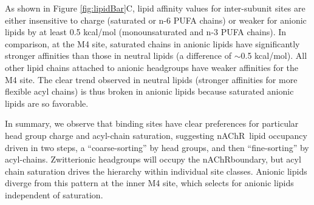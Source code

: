 \documentclass[%
 aip,
 amsmath,amssymb,
 preprint,%
]{revtex4-1}\usepackage{setspace}
\newcommand{\nachr}{nAChR}
\begin{document}
As shown in Figure \ref{fig:lipidBar}C, lipid affinity values for inter-subunit sites are either insensitive to charge (saturated or n-6 PUFA chains) or weaker for anionic lipids by at least 0.5 kcal/mol (monounsaturated and n-3 PUFA chains).  In comparison, at the M4 site, saturated chains in anionic lipids have significantly stronger affinities than those in neutral lipids (a difference of $\sim$0.5 kcal/mol). All other lipid chains attached to anionic headgroups have weaker affinities for the M4 site. The clear trend observed in neutral lipids (stronger affinities for more flexible acyl chains) is thus broken in anionic lipids because saturated anionic lipids are so favorable.  %

In summary, we observe that binding sites have clear preferences for particular head group charge and acyl-chain saturation, suggesting \nachr~lipid occupancy driven in two steps, a ``coarse-sorting'' by head groups, and then ``fine-sorting'' by acyl-chains.  Zwitterionic headgroups will occupy the \nachr boundary, but acyl chain saturation drives the hierarchy within individual site classes. Anionic lipids diverge from this pattern at the inner M4 site, which selects for anionic lipids independent of saturation. 
\end{document}
